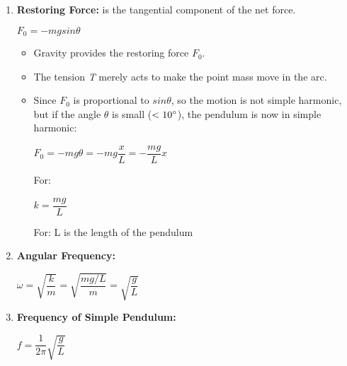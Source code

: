 \documentclass[10pt]{article}
\begin{document}
\begin{enumerate}
	\item \textbf{Restoring Force:} is the tangential component of the net force. \\
	\begin{mybox}
		\begin{center}
			$F_{0} = -mg sin \theta$
		\end{center}
	\end{mybox}

	\begin{itemize}
		\item Gravity provides the restoring force $F_{0}$.
		\item The tension \textit{T} merely acts to make the point mass move in the arc.
		\item Since $F_{0}$ is proportional to $sin \theta$, so the motion is not simple harmonic, but if the angle $\theta$ is small ($< 10 \degree$), the pendulum is now in simple harmonic:\\
		\begin{mybox}
			\begin{center}
				$F_{0} = -mg \theta = -mg \dfrac{x}{L}  = -\dfrac{mg}{L} x$
			\end{center}
		\end{mybox}
		For: \\
		\begin{mybox}
			\begin{center}
				$k = \dfrac{mg}{L}$
			\end{center}
			For: L is the length of the pendulum
		\end{mybox}
	\end{itemize}

	\item \textbf{Angular Frequency: } \\
	\begin{mybox}
		\begin{center}
			$\omega = \sqrt{\dfrac{k}{m}} = \sqrt{\dfrac{mg / L}{m}} = \sqrt{\dfrac{g}{L}}$
		\end{center}
	\end{mybox}

	\item \textbf{Frequency of Simple Pendulum: } \\
	\begin{mybox}
		\begin{center}
			$f = \dfrac{1}{2 \pi} \sqrt{\dfrac{g}{L}}$
		\end{center}
	\end{mybox}


\end{enumerate}
\end{document}
